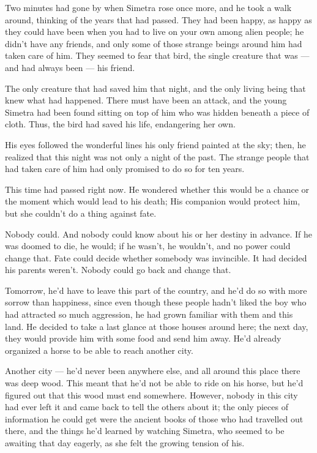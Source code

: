 Two minutes had gone by when Simetra rose once more, and he took a walk around, thinking of the years that had passed. They had been happy, as happy as they could have been when you had to live on your own among alien people; he didn't have any friends, and only some of those strange beings around him had taken care of him. They seemed to fear that bird, the single creature that was --- and had always been --- his friend.

The only creature that had saved him that night, and the only living being that knew what had happened. There must have been an attack, and the young Simetra had been found sitting on top of him who was hidden beneath a piece of cloth. Thus, the bird had saved his life, endangering her own.

His eyes followed the wonderful lines his only friend painted at the sky; then, he realized that this night was not only a night of the past. The strange people that had taken care of him had only promised to do so for ten years.

This time had passed right now. He wondered whether this would be a chance or the moment which would lead to his death; His companion would protect him, but she couldn't do a thing against fate.

Nobody could. And nobody could know about his or her destiny in advance. If he was doomed to die, he would; if he wasn't, he wouldn't, and no power could change that.
Fate could decide whether somebody was invincible. It had decided his parents weren't.
Nobody could go back and change that.

Tomorrow, he'd have to leave this part of the country, and he'd do so with more sorrow than happiness, since even though these people hadn't liked the boy who had attracted so much aggression, he had grown familiar with them and this land.
He decided to take a last glance at those houses around here; the next day, they would provide him with some food and send him away. He'd already organized a horse to be able to reach another city.

Another city --- he'd never been anywhere else, and all around this place there was deep wood. This meant that he'd not be able to ride on his horse, but he'd figured out that this wood must end somewhere. However, nobody in this city had ever left it and came back to tell the others about it; the only pieces of information he could get were the ancient books of those who had travelled out there, and the things he'd learned by watching Simetra, who seemed to be awaiting that day eagerly, as she felt the growing tension of his.


